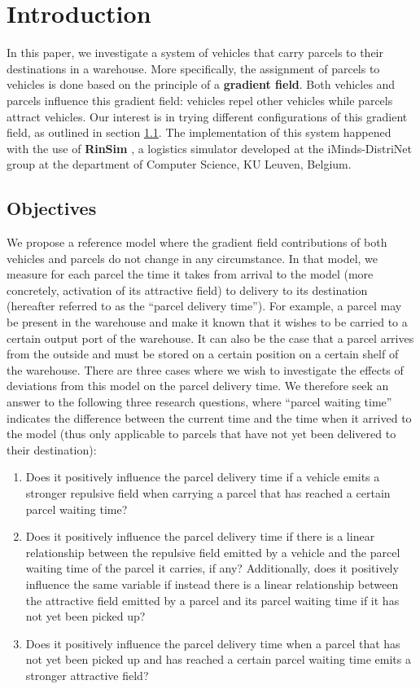 \section{Introduction}\label{sec:intro}
In this paper, we investigate a system of vehicles that carry parcels to their destinations in a warehouse. More specifically, the assignment of parcels to vehicles is done based on the principle of a \textbf{gradient field}. Both vehicles and parcels influence this gradient field: vehicles repel other vehicles while parcels attract vehicles. Our interest is in trying different configurations of this gradient field, as outlined in section \ref{sec:objectives}. The implementation of this system happened with the use of \textbf{RinSim} \cite{rinsim}, a logistics simulator developed at the iMinds-DistriNet group at the department of Computer Science, KU Leuven, Belgium.

\subsection{Objectives}\label{sec:objectives}
We propose a reference model where the gradient field contributions of both vehicles and parcels do not change in any circumstance. In that model, we measure for each parcel the time it takes from arrival to the model (more concretely, activation of its attractive field) to delivery to its destination (hereafter referred to as the ``parcel delivery time''). For example, a parcel may be present in the warehouse and make it known that it wishes to be carried to a certain output port of the warehouse. It can also be the case that a parcel arrives from the outside and must be stored on a certain position on a certain shelf of the warehouse.
There are three cases where we wish to investigate the effects of deviations from this model on the parcel delivery time. We therefore seek an answer to the following three research questions, where ``parcel waiting time'' indicates the difference between the current time and the time when it arrived to the model (thus only applicable to parcels that have not yet been delivered to their destination):

\begin{enumerate}
\item Does it positively influence the parcel delivery time if a vehicle emits a stronger repulsive field when carrying a parcel that has reached a certain parcel waiting time?
\item Does it positively influence the parcel delivery time if there is a linear relationship between the repulsive field emitted by a vehicle and the parcel waiting time of the parcel it carries, if any? Additionally, does it positively influence the same variable if instead there is a linear relationship between the attractive field emitted by a parcel and its parcel waiting time if it has not yet been picked up?
\item Does it positively influence the parcel delivery time when a parcel that has not yet been picked up and has reached a certain parcel waiting time emits a stronger attractive field?
\end{enumerate}

